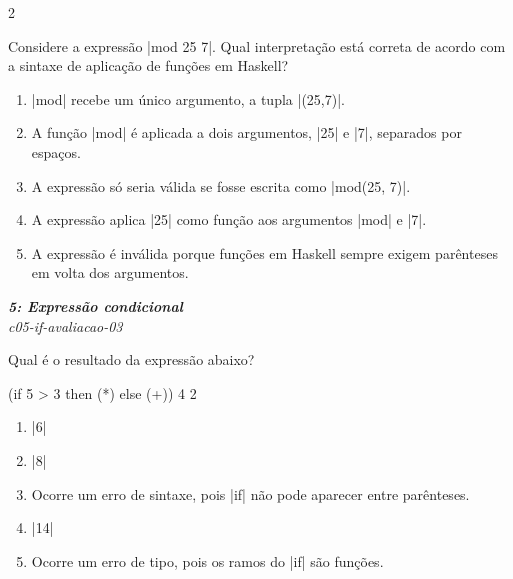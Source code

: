 \documentclass[a4paper,10pt,brazil]{article}
\begin{document}
\begin{multicols}{2}
\begin{flushright}
\end{flushright}
Considere a expressão \haskellinline|mod 25 7|. Qual interpretação está correta de acordo com a sintaxe de aplicação de funções em Haskell?

\begin{enumerate}
  \item \haskellinline|mod| recebe um único argumento, a tupla \haskellinline|(25,7)|.

  \item A função \haskellinline|mod| é aplicada a dois argumentos, \haskellinline|25| e \haskellinline|7|, separados por espaços.

  \item A expressão só seria válida se fosse escrita como \haskellinline|mod(25, 7)|.

  \item A expressão aplica \haskellinline|25| como função aos argumentos \haskellinline|mod| e \haskellinline|7|.

  \item A expressão é inválida porque funções em Haskell sempre exigem parênteses em volta dos argumentos.


\end{enumerate}

\begin{flushright}
  \footnotesize
  \textit{\textbf{5: Expressão condicional}}\\
  \textit{c05-if-avaliacao-03}\\

\end{flushright}
Qual é o resultado da expressão abaixo?
\begin{haskellcode}
(if 5 > 3 then (*) else (+)) 4 2
\end{haskellcode}

\begin{enumerate}
  \item \haskellinline|6|

  \item \haskellinline|8|

  \item Ocorre um erro de sintaxe, pois \haskellinline|if| não pode aparecer entre parênteses.

  \item \haskellinline|14|

  \item Ocorre um erro de tipo, pois os ramos do \haskellinline|if| são funções.



\end{enumerate}
\end{multicols}
\end{document}
